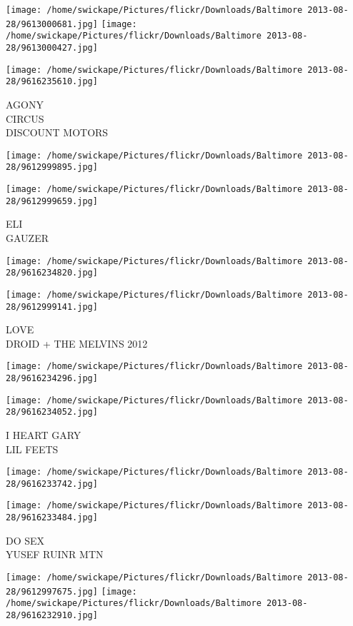 \documentclass[10pt,letterpaper]{article}
\begin{document}
\texttt{[image: /home/swickape/Pictures/flickr/Downloads/Baltimore 2013-08-28/9613000681.jpg]}
\texttt{[image: /home/swickape/Pictures/flickr/Downloads/Baltimore 2013-08-28/9613000427.jpg]}

\vspace{0.25in}
\texttt{[image: /home/swickape/Pictures/flickr/Downloads/Baltimore 2013-08-28/9616235610.jpg]}

AGONY\\
CIRCUS\\
DISCOUNT MOTORS
\pagebreak

\texttt{[image: /home/swickape/Pictures/flickr/Downloads/Baltimore 2013-08-28/9612999895.jpg]}

\vspace{0.25in}
\texttt{[image: /home/swickape/Pictures/flickr/Downloads/Baltimore 2013-08-28/9612999659.jpg]}

ELI\\
GAUZER
\pagebreak

\texttt{[image: /home/swickape/Pictures/flickr/Downloads/Baltimore 2013-08-28/9616234820.jpg]}

\vspace{0.25in}
\texttt{[image: /home/swickape/Pictures/flickr/Downloads/Baltimore 2013-08-28/9612999141.jpg]}

LOVE\\
DROID + THE MELVINS 2012
\pagebreak

\texttt{[image: /home/swickape/Pictures/flickr/Downloads/Baltimore 2013-08-28/9616234296.jpg]}

\vspace{0.25in}
\texttt{[image: /home/swickape/Pictures/flickr/Downloads/Baltimore 2013-08-28/9616234052.jpg]}

I HEART GARY\\
LIL FEETS
\pagebreak

\texttt{[image: /home/swickape/Pictures/flickr/Downloads/Baltimore 2013-08-28/9616233742.jpg]}

\vspace{0.25in}
\texttt{[image: /home/swickape/Pictures/flickr/Downloads/Baltimore 2013-08-28/9616233484.jpg]}

DO SEX\\
YUSEF RUINR MTN
\pagebreak

\texttt{[image: /home/swickape/Pictures/flickr/Downloads/Baltimore 2013-08-28/9612997675.jpg]}
\texttt{[image: /home/swickape/Pictures/flickr/Downloads/Baltimore 2013-08-28/9616232910.jpg]}
\end{document}
